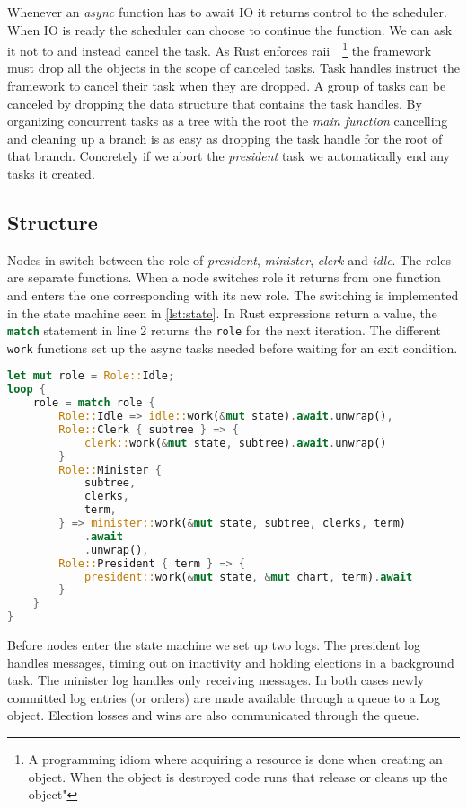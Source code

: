 Whenever an \textit{async} function has to await IO it returns control to the scheduler. When IO is ready the scheduler can choose to continue the function. We can ask it not to and instead cancel the task. As Rust enforces \acf{raii}~\cite[p.~389]{raii}~\footnote{A programming idiom where acquiring a resource is done when creating an object. When the object is destroyed code runs that release or cleans up the object"} the framework must drop all the objects in the scope of canceled tasks. 
Task handles instruct the framework to cancel their task when they are dropped. A group of tasks can be canceled by dropping the data structure that contains the task handles. By organizing concurrent tasks as a tree with the root the \textsl{main function} cancelling and cleaning up a branch is as easy as dropping the task handle for the root of that branch. Concretely if we abort the \textsl{president} task we automatically end any tasks it created.

\subsection{Structure}
Nodes in \name{} switch between the role of \textit{president}, \textit{minister}, \textit{clerk} and \textit{idle}. The roles are separate functions. When a node switches role it returns from one function and enters the one corresponding with its new role. The switching is implemented in the state machine seen in \cref{lst:state}. In Rust expressions return a value, the \lstinline[language=rust]{match} statement in line 2 returns the \lstinline[language=rust]{role} for the next iteration. The different \lstinline[language=rust]{work} functions set up the async tasks needed before waiting for an exit condition.
%
\begin{lstlisting}[float,language=rust,style=boxed,tabsize=2,caption={The state machine switching between a nodes different roles},label=lst:state]
let mut role = Role::Idle;
loop {
	role = match role {
		Role::Idle => idle::work(&mut state).await.unwrap(),
		Role::Clerk { subtree } => {
			clerk::work(&mut state, subtree).await.unwrap()
		}
		Role::Minister {
			subtree,
			clerks,
			term,
		} => minister::work(&mut state, subtree, clerks, term)
			.await
			.unwrap(),
		Role::President { term } => {
			president::work(&mut state, &mut chart, term).await
		}
	}
}
\end{lstlisting}
\clearpage
%
Before nodes enter the state machine we set up two \raft{} logs. The president log handles messages, timing out on inactivity and holding elections in a background task. The minister log handles only receiving messages. In both cases newly committed log entries (or orders) are made available through a queue to a \raft{} Log object. Election losses and wins are also communicated through the queue.


